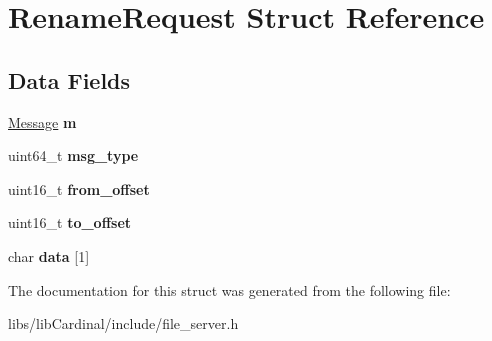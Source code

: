 \hypertarget{structRenameRequest}{}\section{Rename\+Request Struct Reference}
\label{structRenameRequest}
\subsection*{Data Fields}
\begin{DoxyCompactItemize}
\item 
\hyperlink{structMessage}{Message} {\bfseries m}\hypertarget{structRenameRequest_a4aadc8f2117d931c584cf883c0cfe70f}{}\label{structRenameRequest_a4aadc8f2117d931c584cf883c0cfe70f}

\item 
uint64\+\_\+t {\bfseries msg\+\_\+type}\hypertarget{structRenameRequest_abe2bf2fe5bd57ead4764bb89352ae5f9}{}\label{structRenameRequest_abe2bf2fe5bd57ead4764bb89352ae5f9}

\item 
uint16\+\_\+t {\bfseries from\+\_\+offset}\hypertarget{structRenameRequest_ab99b74bbe0b1502a728165c5e4acb425}{}\label{structRenameRequest_ab99b74bbe0b1502a728165c5e4acb425}

\item 
uint16\+\_\+t {\bfseries to\+\_\+offset}\hypertarget{structRenameRequest_a8724f9098457fac8ab90368c6b3cd70c}{}\label{structRenameRequest_a8724f9098457fac8ab90368c6b3cd70c}

\item 
char {\bfseries data} \mbox{[}1\mbox{]}\hypertarget{structRenameRequest_a9e1bc5397f4436e9a2fb8f3c0bca99f1}{}\label{structRenameRequest_a9e1bc5397f4436e9a2fb8f3c0bca99f1}

\end{DoxyCompactItemize}


The documentation for this struct was generated from the following file\+:\begin{DoxyCompactItemize}
\item 
libs/lib\+Cardinal/include/file\+\_\+server.\+h\end{DoxyCompactItemize}

